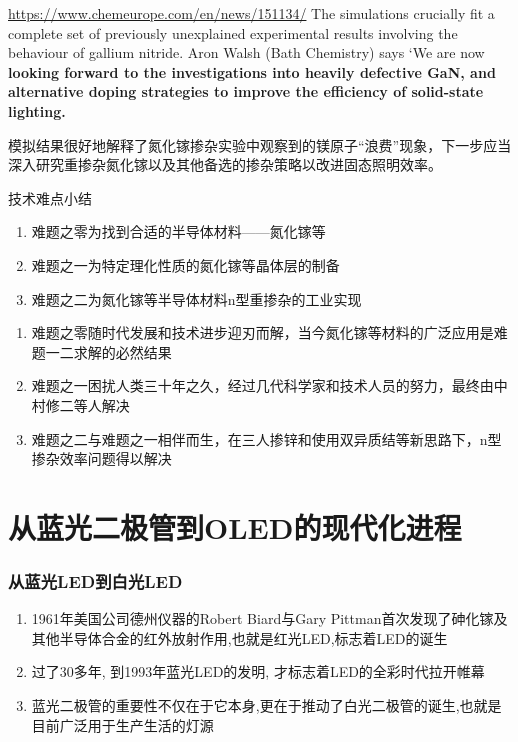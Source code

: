 \documentclass{beamer}
\newenvironment{slide}{
    \begin{frame}{\bfseries{\sectiontitle}}
}{
    \end{frame}
}
\let\sectiononly\section
\renewcommand{\section}[1]{
    \sectiononly{#1}
    \let\sectiontitle\relax
    \newcommand{\sectiontitle}{#1}
}
\begin{document}
\begin{slide}{\url{https://www.chemeurope.com/en/news/151134/}}
    The simulations crucially fit a complete set of previously unexplained experimental results involving the behaviour of gallium nitride. Aron Walsh (Bath Chemistry) says `We are now \textbf{looking forward to the investigations into heavily defective GaN, and alternative doping strategies to improve the efficiency of solid-state lighting.}
    \bigskip

    模拟结果很好地解释了氮化镓掺杂实验中观察到的镁原子“浪费”现象，下一步应当深入研究重掺杂氮化镓以及其他备选的掺杂策略以改进固态照明效率。
\end{slide}

\begin{slide}{技术难点小结}
    \begin{enumerate}
    \item 难题之零为找到合适的半导体材料——氮化镓等
    \item 难题之一为特定理化性质的氮化镓等晶体层的制备
    \item 难题之二为氮化镓等半导体材料n型重掺杂的工业实现
    \end{enumerate}
    \bigskip

    \begin{enumerate}
    \item 难题之零随时代发展和技术进步迎刃而解，当今氮化镓等材料的广泛应用是难题一二求解的必然结果
    \item 难题之一困扰人类三十年之久，经过几代科学家和技术人员的努力，最终由中村修二等人解决
    \item 难题之二与难题之一相伴而生，在三人掺锌和使用双异质结等新思路下，n型掺杂效率问题得以解决
    \end{enumerate}
\end{slide}

\part{从蓝光二极管到OLED的现代化进程}

\begin{frame}
    \partpage
    \tableofcontents
\end{frame}

\section{从蓝光LED到白光LED}

\begin{slide}
\begin{enumerate}[1.]
    \item 1961年美国公司德州仪器的Robert Biard与Gary Pittman首次发现了砷化镓及其他半导体合金的红外放射作用,也就是红光LED,标志着LED的诞生
    \item 过了30多年, 到1993年蓝光LED的发明, 才标志着LED的全彩时代拉开帷幕
    \item 蓝光二极管的重要性不仅在于它本身,更在于推动了白光二极管的诞生,也就是目前广泛用于生产生活的灯源
\end{enumerate}
\end{slide}
\end{document}
